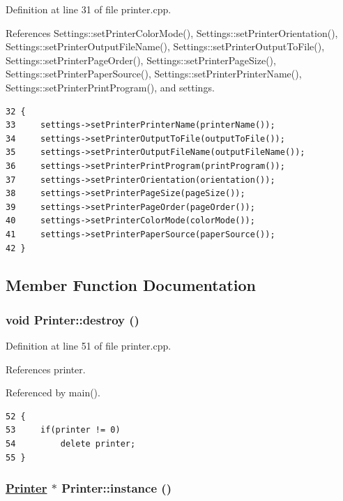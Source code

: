Definition at line 31 of file printer.cpp.

References Settings::set\-Printer\-Color\-Mode(), Settings::set\-Printer\-Orientation(), Settings::set\-Printer\-Output\-File\-Name(), Settings::set\-Printer\-Output\-To\-File(), Settings::set\-Printer\-Page\-Order(), Settings::set\-Printer\-Page\-Size(), Settings::set\-Printer\-Paper\-Source(), Settings::set\-Printer\-Printer\-Name(), Settings::set\-Printer\-Print\-Program(), and settings.

\footnotesize\begin{verbatim}32 {
33     settings->setPrinterPrinterName(printerName());
34     settings->setPrinterOutputToFile(outputToFile());
35     settings->setPrinterOutputFileName(outputFileName());
36     settings->setPrinterPrintProgram(printProgram());
37     settings->setPrinterOrientation(orientation());
38     settings->setPrinterPageSize(pageSize());
39     settings->setPrinterPageOrder(pageOrder());
40     settings->setPrinterColorMode(colorMode());
41     settings->setPrinterPaperSource(paperSource());
42 }
\end{verbatim}\normalsize 




\subsection{Member Function Documentation}
\hypertarget{classPrinter_a0}{
\subsubsection[destroy]{\setlength{\rightskip}{0pt plus 5cm}void Printer::destroy ()}}
\label{classPrinter_a0}


Definition at line 51 of file printer.cpp.

References printer.

Referenced by main().

\footnotesize\begin{verbatim}52 {
53     if(printer != 0)
54         delete printer;
55 }
\end{verbatim}\normalsize 


\hypertarget{classPrinter_e0}{
\subsubsection[instance]{\setlength{\rightskip}{0pt plus 5cm}\hyperlink{classPrinter}{Printer} $\ast$ Printer::instance ()}}
\label{classPrinter_e0}


